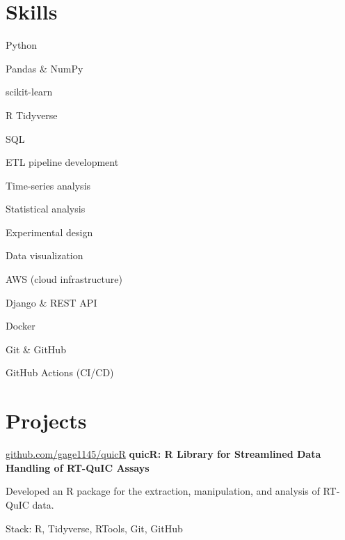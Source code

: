 \documentclass{resume}
\begin{document}
    \section{Skills}
        \begin{skills}
            \item Python 
            \item Pandas \& NumPy
            \item scikit-learn
            \item R Tidyverse
            \item SQL
            \item ETL pipeline development
            \item Time-series analysis
            \item Statistical analysis
            \item Experimental design
            \item Data visualization
            \item AWS (cloud infrastructure)
            \item Django \& REST API
            \item Docker
            \item Git \& GitHub
            \item GitHub Actions (CI/CD)
        \end{skills}
    

    \section{Projects}
        \begin{software}{\href{https://github.com/gage1145/quicR}{github.com/gage1145/quicR}}
            \textbf{quicR: R Library for Streamlined Data Handling of RT-QuIC Assays}
        \end{software}
        \begin{highlights}
            \item Developed an R package for the extraction, manipulation, and analysis of RT-QuIC data.
            \item Stack: R, Tidyverse, RTools, Git, GitHub
        \end{highlights}
\end{document}
